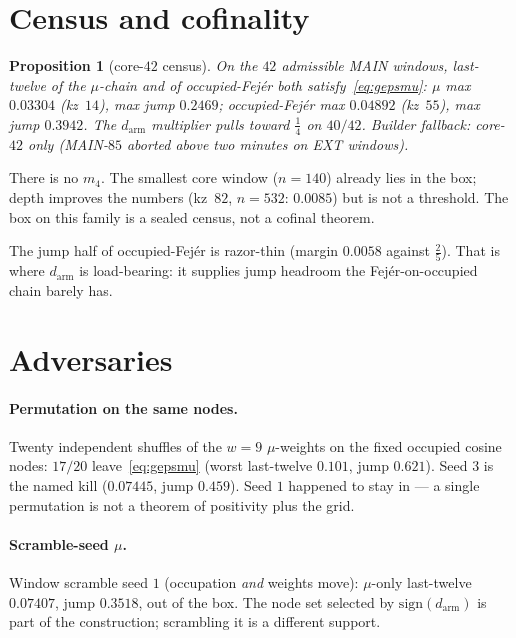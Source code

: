 \documentclass[11pt]{article}
\newtheorem{prop}{Proposition}
\theoremstyle{remark}
\begin{document}
\section{Census and cofinality}\label{sec:census}

\begin{prop}[core-$42$ census]\label{prop:census}
On the $42$ admissible MAIN windows, last-twelve of the
$\mu$-chain and of occupied-Fej\'er both satisfy~\eqref{eq:gepsmu}:
$\mu$ max $0.03304$ (kz~$14$), max jump $0.2469$;
occupied-Fej\'er max $0.04892$ (kz~$55$), max jump $0.3942$.
The $d_{\mathrm{arm}}$ multiplier pulls toward $\tfrac14$ on
$40/42$.
Builder fallback: core-$42$ only (MAIN-$85$ aborted above two
minutes on EXT windows).
\end{prop}

There is no $m_4$.  The smallest core window ($n=140$) already
lies in the box; depth improves the numbers (kz~$82$, $n=532$:
$0.0085$) but is not a threshold.  The box on this family is a
sealed census, not a cofinal theorem.

The jump half of occupied-Fej\'er is razor-thin (margin $0.0058$
against $\tfrac25$).  That is where $d_{\mathrm{arm}}$ is
load-bearing: it supplies jump headroom the Fej\'er-on-occupied
chain barely has.

\section{Adversaries}\label{sec:adv}

\paragraph{Permutation on the same nodes.}
Twenty independent shuffles of the $w=9$ $\mu$-weights on the
fixed occupied cosine nodes: $17/20$ leave~\eqref{eq:gepsmu}
(worst last-twelve $0.101$, jump $0.621$).
Seed $3$ is the named kill ($0.07445$, jump $0.459$).
Seed $1$ happened to stay in --- a single permutation is not a
theorem of positivity plus the grid.

\paragraph{Scramble-seed $\mu$.}
Window scramble seed $1$ (occupation \emph{and} weights move):
$\mu$-only last-twelve $0.07407$, jump $0.3518$, out of the box.
The node set selected by $\mathrm{sign}(d_{\mathrm{arm}})$ is
part of the construction; scrambling it is a different support.
\end{document}
